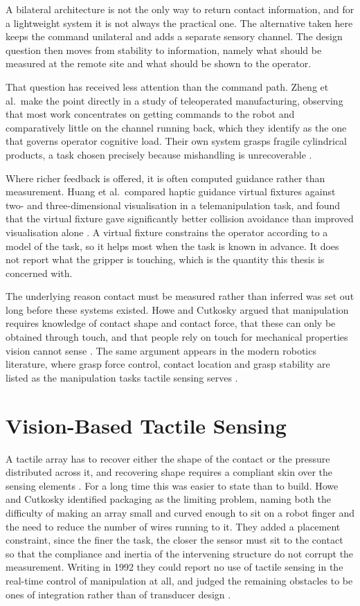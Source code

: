 \documentclass[12pt, a4paper, twoside, openright]{report}
\begin{document}
A bilateral architecture is not the only way to return contact information, and
for a lightweight system it is not always the practical one. The alternative
taken here keeps the command unilateral and adds a separate sensory channel.
The design question then moves from stability to information, namely what
should be measured at the remote site and what should be shown to the operator.

That question has received less attention than the command path. Zheng et al.\
make the point directly in a study of teleoperated manufacturing, observing
that most work concentrates on getting commands to the robot and comparatively
little on the channel running back, which they identify as the one that
governs operator cognitive load. Their own system grasps fragile cylindrical
products, a task chosen precisely because mishandling is unrecoverable
\cite{zheng2024}.

Where richer feedback is offered, it is often computed guidance rather than
measurement. Huang et al.\ compared haptic guidance virtual fixtures against
two- and three-dimensional visualisation in a telemanipulation task, and found
that the virtual fixture gave significantly better collision avoidance than
improved visualisation alone \cite{huang2019}. A virtual fixture constrains the
operator according to a model of the task, so it helps most when the task is
known in advance. It does not report what the gripper is touching, which is the
quantity this thesis is concerned with.

The underlying reason contact must be measured rather than inferred was set out
long before these systems existed. Howe and Cutkosky argued that manipulation
requires knowledge of contact shape and contact force, that these can only be
obtained through touch, and that people rely on touch for mechanical properties
vision cannot sense \cite{howe1992}. The same argument appears in the modern
robotics literature, where grasp force control, contact location and grasp
stability are listed as the manipulation tasks tactile sensing serves
\cite{cutkosky2016}.

\section{Vision-Based Tactile Sensing}
\label{sec:lit-vbts}

A tactile array has to recover either the shape of the contact or the pressure
distributed across it, and recovering shape requires a compliant skin over the
sensing elements \cite{cutkosky2016,howe1992}. For a long time this was easier
to state than to build. Howe and Cutkosky identified packaging as the limiting
problem, naming both the difficulty of making an array small and curved enough
to sit on a robot finger and the need to reduce the number of wires running to
it. They added a placement constraint, since the finer the task, the closer
the sensor must sit to the contact so that the compliance and inertia of the
intervening structure do not corrupt the measurement. Writing in 1992 they
could report no use of tactile sensing in the real-time control of
manipulation at all, and judged the remaining obstacles to be ones of
integration rather than of transducer design \cite{howe1992}.
\end{document}
